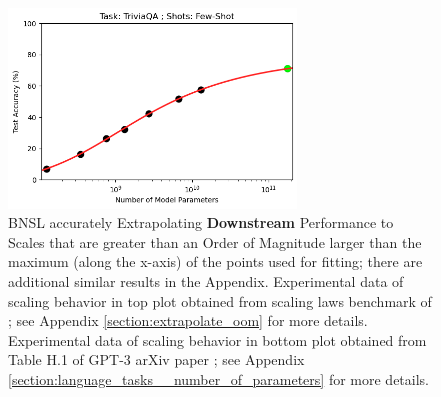 \documentclass{article} %
\begin{document}
\begin{figure}[h]
\hspace{4.95mm}\includegraphics[width=0.6825\textwidth]{figures/gpt-3__parameter_scaling/TriviaQA___Few-Shot.png}



\vspace{-3.55mm}
    \caption{
    BNSL accurately Extrapolating \textbf{Downstream} Performance to Scales that are greater than an Order of Magnitude larger than the maximum (along the x-axis) of the points used for fitting; there are additional similar results in the Appendix. Experimental data of scaling behavior in top plot obtained from scaling laws benchmark of \cite{Alabdulmohsi2022revisiting}; see Appendix \ref{section:extrapolate_oom} for more details. Experimental data of scaling behavior in bottom plot obtained from Table H.1 of GPT-3 arXiv paper \citep{brown2020language}; see Appendix \ref{section:language_tasks__number_of_parameters} for more details. 
    }
    \label{fig:extrapolate_oom_main_paper}
    \vspace{-1.7mm}
\end{figure}
\end{document}
